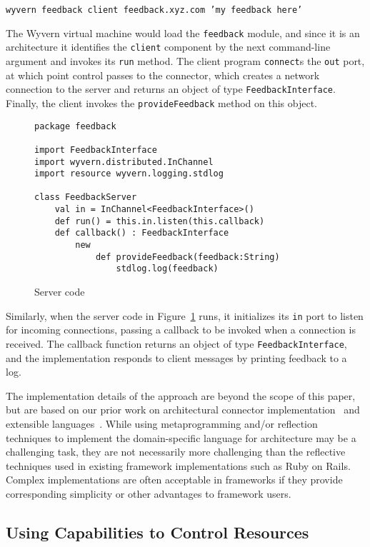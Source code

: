 \documentclass[runningheads]{llncs}
\begin{document}
\begin{sloppypar}
\texttt{wyvern feedback client feedback.xyz.com 'my feedback here'}

The Wyvern virtual machine would load the \texttt{feedback} module, and since it is an architecture it identifies the \texttt{client} component by the next command-line argument and invokes its \texttt{run} method.  The client program \texttt{connect}s the \texttt{out} port, at which point control passes to the connector, which creates a network connection to the server and returns an object of type \texttt{FeedbackInterface}.  Finally, the client invokes the \texttt{provideFeedback} method on this object.


\begin{figure}[t]
\begin{lstlisting}
package feedback

import FeedbackInterface
import wyvern.distributed.InChannel
import resource wyvern.logging.stdlog

class FeedbackServer
    val in = InChannel<FeedbackInterface>()
    def run() = this.in.listen(this.callback)
    def callback() : FeedbackInterface
        new
            def provideFeedback(feedback:String)
                stdlog.log(feedback)

\end{lstlisting}
\caption{Server code}
\label{f-server}
\end{figure}


Similarly, when the server code in Figure~\ref{f-server} runs, it initializes its \texttt{in} port to listen for incoming connections, passing a callback to be invoked when a connection is received.  The callback function returns an object of type \texttt{FeedbackInterface}, and the implementation responds to client messages by printing feedback to a log.


The implementation details of the approach are beyond the scope of this paper, but are based on our prior work on architectural connector implementation~\cite{ASCN03} and extensible languages~\cite{TSLs-ECOOP14}.  While using metaprogramming and/or reflection techniques to implement the domain-specific language for architecture may be a challenging task, they are not necessarily more challenging than the reflective techniques used in existing framework implementations such as Ruby on Rails.  Complex implementations are often acceptable in frameworks if they provide corresponding simplicity or other advantages to framework users.


\subsection{Using Capabilities to Control Resources}


\end{sloppypar}
\end{document}
